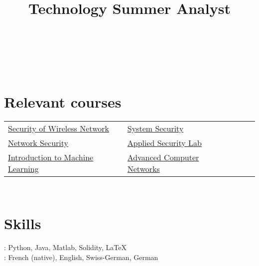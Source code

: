 \documentclass[mm, 11pt]{simple_style}
\begin{document}
\begin{resume}
\begin{position}
{    }
\end{position}\\
\begin{position}
    \title{Technology Summer Analyst}
\end{position}\\
\sectionline
\section{Relevant courses}
    \begin{tabular}{lllll}
        \href{http://www.syssec.ethz.ch/education/sown/sown_AS16.html}{Security of Wireless Network} & \href{http://www.syssec.ethz.ch/education/system_security/system_security_as16.html}{System Security}\\
        \href{https://netsec.ethz.ch/courses/netsec-2016/}{Network Security} & \href{http://www.infsec.ethz.ch/education/as2016.html}{Applied Security Lab} \\
        \href{https://www.cs.cmu.edu/~10601b/}{Introduction to Machine Learning} & \href{https://ndal.ethz.ch/courses/acn.html}{Advanced Computer Networks}\\
    \end{tabular}\\
\sectionline
\section{Skills}
: Python, Java, Matlab, Solidity, \LaTeX\\
: French (native), English, Swiss-German, German\\
\sectionline

\end{resume}
\end{document}
